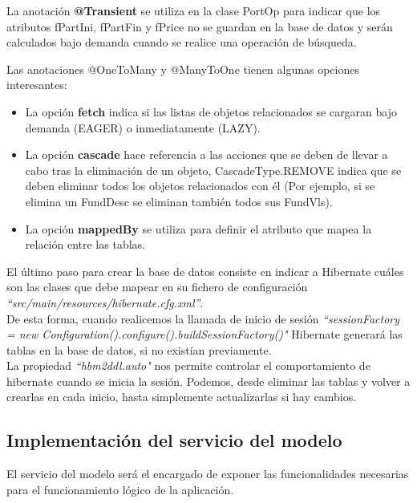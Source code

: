 \documentclass[12pt, a4paper]{book}
\begin{document}
La anotación \textbf{@Transient} se utiliza en la clase PortOp para indicar que los atributos fPartIni, fPartFin y fPrice no se guardan en la base de datos y serán calculados bajo demanda cuando se realice una operación de búsqueda.

\newpage
Las anotaciones @OneToMany y @ManyToOne tienen algunas opciones interesantes:
\begin{itemize}
	\item La opción \textbf{fetch} indica si las listas de objetos relacionados se cargaran bajo demanda (EAGER) o inmediatamente (LAZY).
	\item La opción \textbf{cascade} hace referencia a las acciones que se deben de llevar a cabo tras la eliminación de un objeto, CascadeType.REMOVE indica que se deben eliminar todos los objetos relacionados con él (Por ejemplo, si se elimina un FundDesc se eliminan también todos sus FundVls).
	\item La opción \textbf{mappedBy} se utiliza para definir el atributo que mapea la relación entre las tablas.\\
\end{itemize}

 El último paso para crear la base de datos consiste en indicar a Hibernate cuáles son las clases que debe mapear en su fichero de configuración \textit{``src/main/resources/hibernate.cfg.xml''}.\\
 
  De esta forma, cuando realicemos la llamada de inicio de sesión \textit{``sessionFactory = new Configuration().configure().buildSessionFactory()"} Hibernate generará las tablas en la base de datos, si no existían previamente.\\
 
  La propiedad \textit{``hbm2ddl.auto"} nos permite controlar el comportamiento de hibernate cuando se inicia la sesión. Podemos, desde eliminar las tablas y volver a crearlas en cada inicio, hasta simplemente actualizarlas si hay cambios.

\newpage

\subsection{Implementación del servicio del modelo}

El servicio del modelo será el encargado de exponer las funcionalidades necesarias para el funcionamiento lógico de la aplicación.\\
\end{document}
